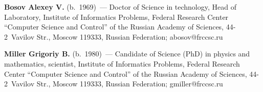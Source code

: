 \noindent
\textbf{Bosov Alexey V.} (b.\ 1969)~---
Doctor of Science in technology, 
Head of Laboratory, Institute of Informatics Problems, Federal Research Center 
``Computer Science and Control'' 
of the Russian Academy of Sciences, 44-2~Vavilov Str., Moscow 119333, Russian Federation; 
\mbox{abosov@frccsc.ru}

\vspace*{3pt}

\noindent
\textbf{Miller Grigoriy B.} (b.\ 1980)~---
Candidate of Science (PhD) in physics and mathematics, scientist, 
Institute of Informatics Problems, Federal Research Center 
``Computer Science and Control'' of the Russian Academy of Sciences,
44-2~Vavilov Str., Moscow 119333, Russian Federation; \mbox{gmiller@frccsc.ru}
\label{end\stat}


\renewcommand{\bibname}{\protect\rm Литература}